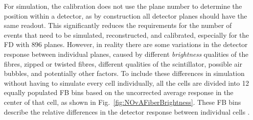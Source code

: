 

For simulation, the calibration does not use the plane number to determine the position within a detector, as by construction all detector planes should have the same readout. This significantly reduces the requirements for the number of events that need to be simulated, reconstructed, and calibrated, especially for the \gls{FD} with 896 planes. However, in reality there are some variations in the detector response between individual planes, caused by different \textit{brightness} qualities of the fibres, zipped or twisted fibres, different qualities of the scintillator, possible air bubbles, and potentially other factors. To include these differences in simulation without having to simulate every cell individually, all the cells are divided into 12 equally populated \gls{FB} bins based on
the uncorrected average response in the center of that cell, as shown in Fig.~\ref{fig:NOvAFiberBrightness}. These \gls{FB} bins describe the relative differences in the detector response between individual cells \cite{NOvA-doc-34909}.

